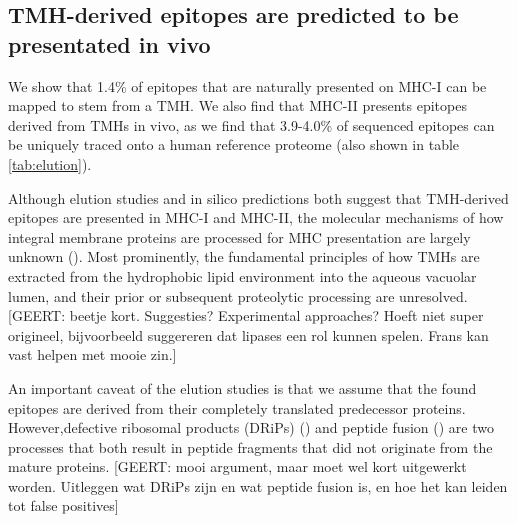 \subsection{TMH-derived epitopes are predicted to be presentated in vivo}

We show that 1.4\% of epitopes that are naturally presented on MHC-I 
can be mapped to stem from a TMH. We also find that MHC-II presents epitopes derived from TMHs in vivo, as we find that 3.9-4.0\% of sequenced epitopes
can be uniquely traced onto a human reference 
proteome (also shown in table \ref{tab:elution}).


Although elution studies and in silico predictions both suggest that TMH-derived epitopes are presented in MHC-I and MHC-II, the molecular mechanisms of how integral membrane proteins are processed for MHC presentation are largely unknown (\cite{bianchi2017}). Most prominently, the fundamental principles of how TMHs are extracted from the  hydrophobic lipid environment into the aqueous vacuolar lumen, and their prior or subsequent proteolytic processing are unresolved. [GEERT: beetje kort. Suggesties? Experimental approaches? Hoeft niet super origineel, bijvoorbeeld suggereren dat lipases een rol kunnen spelen. Frans kan vast helpen met mooie zin.]


An important caveat of the elution studies is that we assume that the found epitopes are derived from their completely translated predecessor proteins.
However,defective ribosomal products (DRiPs) (\cite{yewdell1996defective}) 
and peptide fusion (\cite{delong2016pathogenic}) are
two processes that both result in peptide fragments
that did not originate from the mature proteins. [GEERT: mooi argument, maar moet wel kort uitgewerkt worden. Uitleggen wat DRiPs zijn en wat peptide fusion is, en hoe het kan leiden tot false positives]

